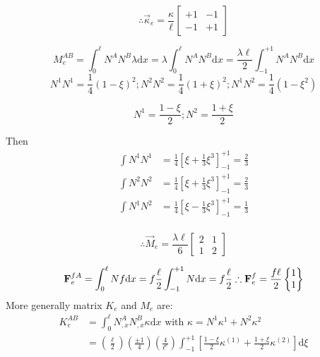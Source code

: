 \begin{equation}
\therefore \vec{\kappa}_e = \frac{\kappa}{\ell} \begin{bmatrix} +1 & -1 \\ -1 & +1 \end{bmatrix}
\end{equation}	

\begin{equation}
M_e^{AB} = \int_0^\ell N^A N^B \lambda \text{d}x = \lambda \int_0^\ell N^A N^B \text{d}x = \frac{\lambda \ell}{2} \int_{-1}^{+1} N^A N^B \text{d}x
\end{equation}
\begin{equation}
N^1 N^1 = \frac{1}{4}(1-\xi)^2 ; N^2 N^2 = \frac{1}{4}(1+\xi)^2 ; N^1 N^2 = \frac{1}{4}(1-\xi^2)
\end{equation}

\begin{equation}
N^1 = \frac{1-\xi}{2} ; N^2 = \frac{1+\xi}{2}
\end{equation}

Then
	\begin{equation}
	\begin{aligned}
	\int N^1 N^1 &= \frac{1}{4} \left[ \xi + \frac{1}{3}\xi^3 \right]_{-1}^{+1} = \frac{2}{3} \\
	\int N^2 N^2 &= \frac{1}{4} \left[ \xi + \frac{1}{3}\xi^3 \right]_{-1}^{+1} = \frac{2}{3} \\
	\int N^1 N^2 &= \frac{1}{4} \left[ \xi - \frac{1}{3}\xi^3 \right]_{-1}^{+1} = \frac{1}{3} \\
	\end{aligned}
	\end{equation}	
	
	\begin{equation}
	\therefore \vec{M}_e = \frac{\lambda \ell}{6} \begin{bmatrix} 2 & 1 \\ 1 & 2 \end{bmatrix}
	\end{equation}
	
	\begin{equation}
	\vec{F}_e^{fA} = \int_0^\ell N f \text{d}x = f \frac{\ell}{2} \int_{-1}^{+1} N \text{d}x = f\frac{\ell}{2} \\
\therefore \vec{F}_e^f = \frac{f\ell}{2} \begin{Bmatrix} 1\\1 \end{Bmatrix}
\end{equation}
 More generally matrix $K_e$ and $M_e$ are: 
\begin{equation}
\begin{aligned}
K_e^{AB} &= \int_0^\ell N_{,x}^A N_{,x}^B \kappa \text{d}x \text{ with } \kappa = N^1 \kappa^1 + N^2 \kappa^2 \\
&= \left(\frac{\ell}{2}\right)\left(\frac{\pm 1}{4}\right)\left(\frac{4}{\ell^e}\right) \int_{-1}^{+1} \left[ \frac{1 -\xi}{2} \kappa^{(1)} + \frac{1 + \xi}{2} \kappa^{(2)} \right] \text{d}\xi\\
\end{aligned}
\end{equation}

